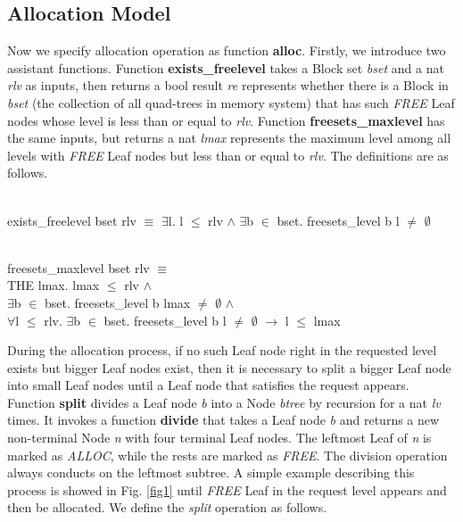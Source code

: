\subsection{Allocation Model}
Now we specify allocation operation as function \textbf{alloc}. Firstly, we introduce two assistant functions. Function \textbf{exists\_freelevel} takes a Block set \emph{bset} and a nat \emph{rlv} as inputs, then returns a bool result \emph{re} represents whether there is a Block in \emph{bset} (the collection of all quad-trees in memory system) that has such \emph{FREE} Leaf nodes whose level is less than or equal to \emph{rlv}. Function \textbf{freesets\_maxlevel} has the same inputs, but returns a nat \emph{lmax} represents the maximum level among all levels with \emph{FREE} Leaf nodes but less than or equal to \emph{rlv}. The definitions are as follows.

\begin{definition}  \\
	exists\_freelevel bset rlv $\equiv$ $\exists$l. l $\leq$ rlv $\wedge$ $\exists$b $\in$ bset. freesets\_level b l $\ne$ $\emptyset$
\end{definition}

\begin{definition}  \\
	freesets\_maxlevel bset rlv $\equiv$ \\
	\phantom{x} \hspace{10pt} THE lmax. lmax $\leq$ rlv $\wedge$ \\
	\phantom{x} \hspace{60pt} $\exists$b $\in$ bset. freesets\_level b lmax $\neq$ $\emptyset$ $\wedge$ \\
	\phantom{x} \hspace{60pt} $\forall$l $\leq$ rlv. $\exists$b $\in$ bset. freesets\_level b l $\ne$ $\emptyset$ $\longrightarrow$ l $\leq$ lmax
\end{definition}

During the allocation process, if no such Leaf node right in the requested level exists but bigger Leaf nodes exist, then it is necessary to split a bigger Leaf node into small Leaf nodes until a Leaf node that satisfies the request appears. Function \textbf{split} divides a Leaf node \emph{b} into a Node \emph{btree} by recursion for a nat \emph{lv} times. It invokes a function \textbf{divide} that takes a Leaf node \emph{b} and returns a new non-terminal Node \emph{n} with four terminal Leaf nodes. The leftmost Leaf of \emph{n} is marked as \emph{ALLOC}, while the rests are marked as \emph{FREE}. The division operation always conducts on the leftmost subtree. A simple example describing this process is showed in Fig. \ref{fig1} until \emph{FREE} Leaf in the request level appears and then be allocated. We define the \emph{split} operation as follows.

